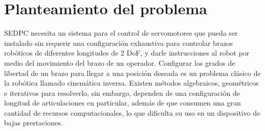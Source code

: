 \section{Planteamiento del problema}

SEDPC necesita un sistema para el control de servomotores que pueda ser instalado sin requerir una configuración exhaustiva para controlar brazos robóticos de diferentes longitudes de 2 DoF, y darle instrucciones al robot por medio del movimiento del brazo de un operador.
\newline\newline\newline
Configurar los grados de libertad de un brazo para llegar a una posición deseada es un problema clásico de la robótica llamado cinemática inversa. Existen métodos algebraicos, geométricos e iterativos para resolverlo, sin embargo, dependen de una configuración de longitud de articulaciones en particular, además de que consumen una gran cantidad de recursos computacionales, lo que dificulta su uso en un dispositivo de bajas prestaciones.